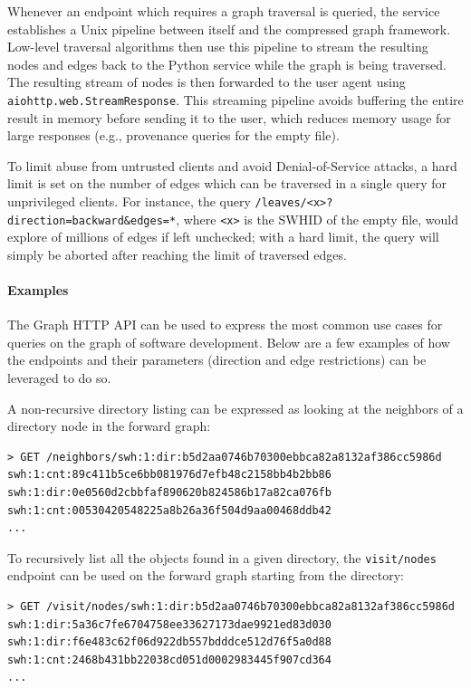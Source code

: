 Whenever an endpoint which requires a graph traversal is queried, the service
establishes a Unix pipeline between itself and the compressed graph framework.
Low-level traversal algorithms then use this pipeline to stream the resulting
nodes and edges back to the Python service while the graph is being traversed.
The resulting stream of nodes is then forwarded to the user agent using
\texttt{aiohttp.web.StreamResponse}. This streaming pipeline avoids buffering
the entire result in memory before sending it to the user, which reduces memory
usage for large responses (e.g., provenance queries for the empty file).

To limit abuse from untrusted clients and avoid Denial-of-Service attacks, a
hard limit is set on the number of edges which can be traversed in a single
query for unprivileged clients. For instance, the query
\texttt{/leaves/<x>?direction=backward\&edges=*}, where \texttt{<x>} is the
\gls{SWHID} of the empty file, would explore of millions of edges if left
unchecked; with a hard limit, the query will simply be aborted after reaching
the limit of traversed edges.

\paragraph{Examples}


The Graph HTTP API can be used to express the most common use cases for queries
on the graph of software development. Below are a few examples of how the
endpoints and their parameters (direction and edge restrictions) can be
leveraged to do so.

A non-recursive directory listing can be expressed as looking at the neighbors
of a directory node in the forward graph:

\begin{verbatim}
> GET /neighbors/swh:1:dir:b5d2aa0746b70300ebbca82a8132af386cc5986d
swh:1:cnt:89c411b5ce6bb081976d7efb48c2158bb4b2bb86
swh:1:dir:0e0560d2cbbfaf890620b824586b17a82ca076fb
swh:1:cnt:00530420548225a8b26a36f504d9aa00468ddb42
...
\end{verbatim}

To recursively list all the objects found in a given directory, the
\texttt{visit/nodes} endpoint can be used on the forward graph starting from
the directory:

\begin{verbatim}
> GET /visit/nodes/swh:1:dir:b5d2aa0746b70300ebbca82a8132af386cc5986d
swh:1:dir:5a36c7fe6704758ee33627173dae9921ed83d030
swh:1:dir:f6e483c62f06d922db557bdddce512d76f5a0d88
swh:1:cnt:2468b431bb22038cd051d0002983445f907cd364
...
\end{verbatim}

